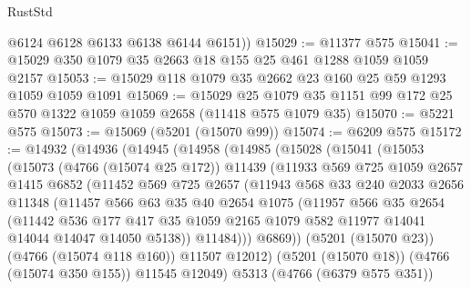 \begin{lexlean}{RustStd}
\begin{coremodule}
{\begin{coremodule}
{{{{{{{{{{{{{{{{{{{{{{{{{{{{{{{{{{{        @6124
        @6128
        @6133
        @6138
        @6144
        @6151))
@15029 := @11377 @575
@15041 := @15029 @350 @1079 @35 @2663 @18 @155 @25 @461 @1288 @1059 @1059 @2157
@15053 := @15029 @118 @1079 @35 @2662 @23 @160 @25 @59 @1293 @1059 @1059 @1091
@15069 := @15029
    @25
    @1079
    @35
    @1151
    @99
    @172
    @25
    @570
    @1322
    @1059
    @1059
    @2658
    (@11418 @575 @1079 @35)
@15070 := @5221 @575
@15073 := @15069 (@5201 (@15070 @99))
@15074 := @6209 @575
@15172 := @14932
    (@14936
      (@14945
        (@14958
          (@14985
            (@15028
              (@15041
                (@15053
                  (@15073
                    (@4766 (@15074 @25 @172))
                    @11439
                    (@11933
                      @569
                      @725
                      @1059
                      @2657
                      @1415
                      @6852
                      (@11452
                        @569
                        @725
                        @2657
                        (@11943
                          @568
                          @33
                          @240
                          @2033
                          @2656
                          @11348
                          (@11457
                            @566
                            @63
                            @35
                            @40
                            @2654
                            @1075
                            (@11957
                              @566
                              @35
                              @2654
                              (@11442
                                @536
                                @177
                                @417
                                @35
                                @1059
                                @2165
                                @1079
                                @582
                                @11977
                                @14041
                                @14044
                                @14047
                                @14050
                                @5138))
                            @11484)))
                      @6869))
                  (@5201 (@15070 @23))
                  (@4766 (@15074 @118 @160))
                  @11507
                  @12012)
                (@5201 (@15070 @18))
                (@4766 (@15074 @350 @155))
                @11545
                @12049)
              @5313
              (@4766 (@6379 @575 @351))
}}}}}}}}}}}}}}}}}}}}}}}}}}}}}}}}}}}
\end{coremodule}}
\end{coremodule}
\end{lexlean}

